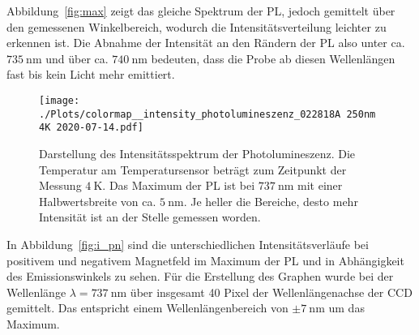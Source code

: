 Abbildung~\ref{fig:max} zeigt das gleiche Spektrum der PL, jedoch gemittelt über den gemessenen Winkelbereich, 
wodurch die Intensitätsverteilung leichter zu erkennen ist. 
Die Abnahme der Intensität an den Rändern der PL also unter ca. $\SI{735}{\nano\meter}$ und über ca. 
$\SI{740}{\nano\meter}$ bedeuten, 
dass die Probe ab diesen Wellenlängen fast bis kein Licht mehr emittiert.
\newpage %
\begin{figure}
    \centering
    \texttt{[image: ./Plots/colormap\_\_intensity\_photolumineszenz\_022818A 250nm 4K 2020-07-14.pdf]}
    \caption{Darstellung des Intensitätsspektrum der Photolumineszenz.
    Die Temperatur  am Temperatursensor beträgt zum Zeitpunkt der Messung $\SI{4}{\kelvin}$. 
    Das Maximum der PL ist bei $\SI{737}{\nano\meter}$ mit einer Halbwertsbreite von ca. $\SI{5}{\nano\meter}$. 
    Je heller die Bereiche, desto mehr Intensität ist an der Stelle gemessen worden.}
    \label{fig:photo}
\end{figure}
\FloatBarrier

In Abbildung~\ref{fig:i_pn} sind die unterschiedlichen Intensitätsverläufe bei positivem und negativem
Magnetfeld im Maximum der PL und in Abhängigkeit des Emissionswinkels zu sehen.
Für die Erstellung des Graphen wurde bei der Wellenlänge $\lambda = \SI{737}{\nano\meter}$ 
über insgesamt 40 Pixel der Wellenlängenachse der CCD gemittelt.
Das entspricht einem Wellenlängenbereich von $\pm \SI{7}{\nano\meter}$ um das Maximum. 

